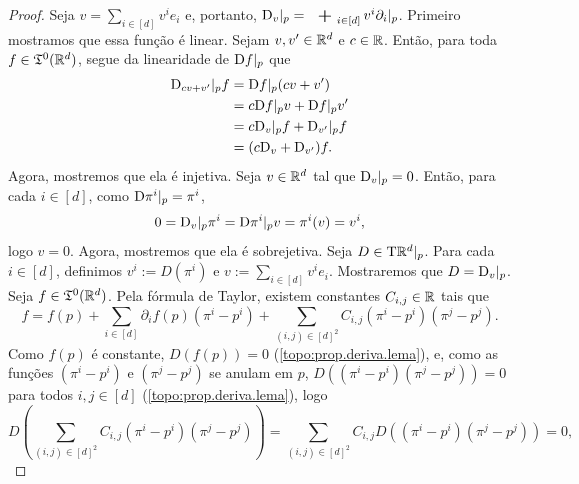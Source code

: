 \begin{proof}
Seja $v = \sum_{i \in [d]} v^ie_i$ e, portanto, $\D_v|_p = \sum_{i \in [d]} v^i \partial_i|_p$. Primeiro mostramos que essa função é linear. Sejam $v,v' \in \mathbb{R}^d$ e $c \in \mathbb{R}$. Então, para toda $f \in \mathfrak{T}^0(\mathbb{R}^d)$, segue da linearidade de $\mathrm{D} f|_p$ que
	\begin{align*}
	\mathrm{D}_{cv+v'}|_p f &= \mathrm{D} f|_p (cv+v') \\
		&= c\mathrm{D} f|_p v + \mathrm{D} f|_p v' \\
		&= c\mathrm{D}_v|_p f + \mathrm{D}_{v'}|_p f \\
		&= (c\mathrm{D}_v+\mathrm{D}_{v'})f.
	\end{align*}
Agora, mostremos que ela é injetiva. Seja $v \in \mathbb{R}^d$ tal que $\mathrm{D}_v|_p = 0$. Então, para cada $i \in [d]$, como $\mathrm{D} \pi^i|_p = \pi^i$,
	\begin{equation*}
	0 = \mathrm{D}_v|_p \pi^i = \mathrm{D} \pi^i|_p v = \pi^i(v) = v^i,
	\end{equation*}
logo $v=0$. Agora, mostremos que ela é sobrejetiva. Seja $D \in \mathrm{T} \mathbb{R}^d|_p$. Para cada $i \in [d]$, definimos $v^i := D(\pi^i)$ e $v := \sum_{i \in [d]} v^ie_i$. Mostraremos que $D = \mathrm{D}_v|_p$. Seja $f \in \mathfrak{T}^0(\mathbb{R}^d)$. Pela fórmula de Taylor, existem constantes $C_{i,j} \in \mathbb{R}$ tais que
	\begin{equation*}
	f = f(p) + \sum_{i \in [d]} \partial_i f(p) (\pi^i-p^i) + \sum_{(i,j) \in [d]^2} C_{i,j}(\pi^i-p^i)(\pi^j-p^j).
	\end{equation*}
Como $f(p)$ é constante, $D(f(p))=0$ (\ref{topo:prop.deriva.lema}), e, como as funções $(\pi^i-p^i)$ e $(\pi^j-p^j)$ se anulam em $p$, $D\left( (\pi^i-p^i)(\pi^j-p^j)\right) = 0$ para todos $i,j \in [d]$ (\ref{topo:prop.deriva.lema}), logo
	\begin{equation*}
	D\left( \sum_{(i,j) \in [d]^2} C_{i,j}(\pi^i-p^i)(\pi^j-p^j)\right) = \sum_{(i,j) \in [d]^2} C_{i,j}D\left( (\pi^i-p^i)(\pi^j-p^j)\right) = 0,

\end{equation*}
\end{proof}
